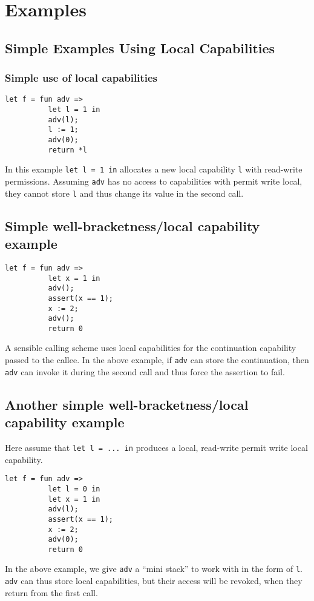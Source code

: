\documentclass{article}
\begin{document}
\section{Examples}
\label{sec:examples}
\subsection{Simple Examples Using Local Capabilities}
\label{subsec:example-loc-cap}
\subsubsection{Simple use of local capabilities}
\begin{verbatim}
let f = fun adv =>
          let l = 1 in
          adv(l);
          l := 1;
          adv(0);
          return *l
\end{verbatim}
In this example \texttt{let l = 1 in} allocates a new local capability \texttt{l} with read-write permissions. Assuming \texttt{adv} has no access to capabilities with permit write local, they cannot store \texttt{l} and thus change its value in the second call.

\subsection{Simple well-bracketness/local capability example}
\begin{verbatim}
let f = fun adv =>
          let x = 1 in
          adv();
          assert(x == 1);
          x := 2;
          adv();
          return 0
\end{verbatim}
A sensible calling scheme uses local capabilities for the continuation capability passed to the callee. In the above example, if \texttt{adv} can store the continuation, then 
\texttt{adv} can invoke it during the second call and thus force the assertion to fail.

\subsection{Another simple well-bracketness/local capability example}
Here assume that \texttt{let l = ... in} produces a local, read-write permit write local capability.
\begin{verbatim}
let f = fun adv =>
          let l = 0 in
          let x = 1 in
          adv(l);
          assert(x == 1);
          x := 2;
          adv(0);
          return 0
\end{verbatim}
In the above example, we give \texttt{adv} a ``mini stack'' to work with in the form of \texttt{l}. \texttt{adv} can thus store local capabilities, but their access will be revoked, when they return from the first call.
\end{document}
